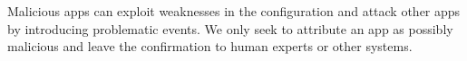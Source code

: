 Malicious apps can exploit weaknesses in the configuration and
attack other apps by introducing problematic events.
We only seek to attribute an app as possibly malicious and
leave the {\color{black}confirmation} to human experts or other systems.

\begin{comment}
{
\section{Motivating Examples}
\label{sec:motivation}

We use two examples of violations found via our experiments (more details in \S~\ref{sec:eval}) to motivate our work.
Although simple, these examples exemplify the safety problems that arise with third party IoT apps.

\textbf{First Example:} a user installs three smart apps viz., \textit{Light Off When Close}, \textit{Good Night},
and \textit{Big Turn Off} to automate her smart home.
\textit{Light Off When Close} will turn off
configured lights when the configured contact sensor detects door closing;
\textit{Good Night} will change the location mode to \textit{Sleeping}
when all the monitored lights and motion sensors are inactive for
a configured period during night; and
\textit{Big Turn Off} will turn off all the configured devices
when (i) the user touches the app or (ii) the app detects a location mode change.

If we define a safety property as
\textit{temperature should always be higher than 0 degree Celsius},
a violation instance can be discovered by \sys as follows.
At night, after the owner closes the door monitored by
the \textit{Light Off When Close} app, it turns off the lights.
After a while, the app \textit{Good Night} changes the location mode to \textit{Sleeping}.
Upon the location mode change, \textit{Big Turn Off} turns off all of the configured devices,
which includes a heater.
Because the temperature can be below 0 degree during night,
this can lead to a violation of our safety property.

The violation scenario can be avoided if
(i) \textit{Big Turn Off} turns off the configured devices \emph{only} when the user touches the app,
(ii) \textit{Big Turn Off} explicitly asks users to configure that the configured devices {\color{black}to be} turned off
only upon transitioning to a specific mode (\eg, ``Away''),
(iii) \textit{Big Turn Off} is installed together with only apps that change
the location mode to ``Away" when people leave home,
or (iv) \textit{Big Turn Off} is not configured to the heater.
Unfortunately, the first three options are not feasible and users may
have valid reasons to configure the app to control the heater.



\end{comment}
